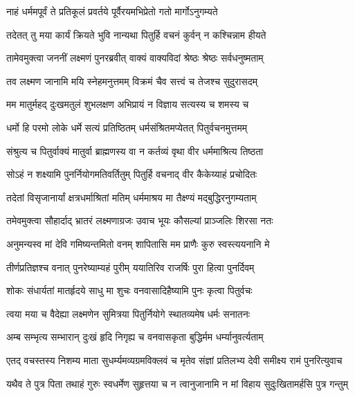 \twolineshloka
{नाहं धर्ममपूर्वं ते प्रतिकूलं प्रवर्तये}
{पूर्वैरयमभिप्रेतो गतो मार्गोऽनुगम्यते} %

\twolineshloka
{तदेतत् तु मया कार्यं क्रियते भुवि नान्यथा}
{पितुर्हि वचनं कुर्वन् न कश्चिन्नाम हीयते} %

\twolineshloka
{तामेवमुक्त्वा जननीं लक्ष्मणं पुनरब्रवीत्}
{वाक्यं वाक्यविदां श्रेष्ठः श्रेष्ठः सर्वधनुष्मताम्} %

\twolineshloka
{तव लक्ष्मण जानामि मयि स्नेहमनुत्तमम्}
{विक्रमं चैव सत्त्वं च तेजश्च सुदुरासदम्} %

\twolineshloka
{मम मातुर्महद् दुःखमतुलं शुभलक्षण}
{अभिप्रायं न विज्ञाय सत्यस्य च शमस्य च} %

\twolineshloka
{धर्मो हि परमो लोके धर्मे सत्यं प्रतिष्ठितम्}
{धर्मसंश्रितमप्येतत् पितुर्वचनमुत्तमम्} %

\twolineshloka
{संश्रुत्य च पितुर्वाक्यं मातुर्वा ब्राह्मणस्य वा}
{न कर्तव्यं वृथा वीर धर्ममाश्रित्य तिष्ठता} %

\twolineshloka
{सोऽहं न शक्ष्यामि पुनर्नियोगमतिवर्तितुम्}
{पितुर्हि वचनाद् वीर कैकेय्याहं प्रचोदितः} %

\twolineshloka
{तदेतां विसृजानार्यां क्षत्रधर्माश्रितां मतिम्}
{धर्ममाश्रय मा तैक्ष्ण्यं मद्बुद्धिरनुगम्यताम्} %

\twolineshloka
{तमेवमुक्त्वा सौहार्दाद् भ्रातरं लक्ष्मणाग्रजः}
{उवाच भूयः कौसल्यां प्राञ्जलिः शिरसा नतः} %

\twolineshloka
{अनुमन्यस्व मां देवि गमिष्यन्तमितो वनम्}
{शापितासि मम प्राणैः कुरु स्वस्त्ययनानि मे} %

\twolineshloka
{तीर्णप्रतिज्ञश्च वनात् पुनरेष्याम्यहं पुरीम्}
{ययातिरिव राजर्षिः पुरा हित्वा पुनर्दिवम्} %

\twolineshloka
{शोकः संधार्यतां मातर्हृदये साधु मा शुचः}
{वनवासादिहैष्यामि पुनः कृत्वा पितुर्वचः} %

\twolineshloka
{त्वया मया च वैदेह्या लक्ष्मणेन सुमित्रया}
{पितुर्नियोगे स्थातव्यमेष धर्मः सनातनः} %

\twolineshloka
{अम्ब सम्भृत्य सम्भारान् दुःखं हृदि निगृह्य च}
{वनवासकृता बुद्धिर्मम धर्म्यानुवर्त्यताम्} %

\twolineshloka
{एतद् वचस्तस्य निशम्य माता सुधर्म्यमव्यग्रमविक्लवं च}
{मृतेव संज्ञां प्रतिलभ्य देवी समीक्ष्य रामं पुनरित्युवाच} %

\twolineshloka
{यथैव ते पुत्र पिता तथाहं गुरुः स्वधर्मेण सुहृत्तया च}
{न त्वानुजानामि न मां विहाय सुदुःखितामर्हसि पुत्र गन्तुम्} %

